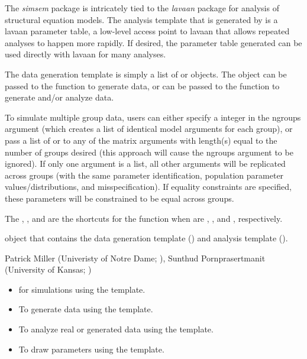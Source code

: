 \documentclass[a4paper]{book}
\begin{document}
\begin{Details}\relax
The \emph{simsem} package is intricately tied to the \emph{lavaan} package for analysis of structural equation models. The analysis template that is generated by  is a lavaan parameter table, a low-level access point to lavaan that allows repeated analyses to happen more rapidly. If desired, the parameter table generated can be used directly with lavaan for many analyses.

The data generation template is simply a list of  or  objects. The  object can be passed to the function  to generate data, or can be passed to the function  to generate and/or analyze data.

To simulate multiple group data, users can either specify a integer in the ngroups argument (which creates a list of identical model arguments for each group), or pass a list of   or  to any of the matrix arguments with length(s) equal to the number of groups desired (this approach will cause the ngroups argument to be ignored). If only one argument is a list, all other arguments will be replicated across groups (with the same parameter identification, population parameter values/distributions, and misspecification). If equality constraints are specified, these parameters will be constrained to be equal across groups.	

The , , and  are the shortcuts for the  function when  are , , and , respectively.
\end{Details}
%
\begin{Value}
 object that contains the data generation template () and analysis template ().
\end{Value}
%
\begin{Author}\relax
Patrick Miller (Univeristy of Notre Dame; ), 
Sunthud Pornprasertmanit (University of Kansas; )
\end{Author}
%
\begin{SeeAlso}\relax
\begin{itemize}
\item {} for simulations using the  template.
\item {} To generate data using the  template.
\item {} To analyze real or generated data using the  template.
\item {} To draw parameters using the  template.

\end{itemize}

\end{SeeAlso}
\end{document}
